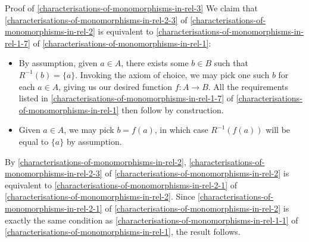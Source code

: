 \begin{Proof}{Proof of \cref{characterisations-of-monomorphisms-in-rel-3}}%
    We claim that \cref{characterisations-of-monomorphisms-in-rel-2-3} of \cref{characterisations-of-monomorphisms-in-rel-2} is equivalent to \cref{characterisations-of-monomorphisms-in-rel-1-7} of \cref{characterisations-of-monomorphisms-in-rel-1}:
    \begin{itemize}
        \item{}By assumption, given $a\in A$, there exists some $b\in B$ such that $R^{-1}(b)=\{a\}$. Invoking the axiom of choice, we may pick one such $b$ for each $a\in A$, giving us our desired function $f\colon A\to B$. All the requirements listed in \cref{characterisations-of-monomorphisms-in-rel-1-7} of \cref{characterisations-of-monomorphisms-in-rel-1} then follow by construction.
        \item{}Given $a\in A$, we may pick $b=f(a)$, in which case $R^{-1}(f(a))$ will be equal to $\{a\}$ by assumption.
    \end{itemize}
    By \cref{characterisations-of-monomorphisms-in-rel-2}, \cref{characterisations-of-monomorphisms-in-rel-2-3} of \cref{characterisations-of-monomorphisms-in-rel-2} is equivalent to \cref{characterisations-of-monomorphisms-in-rel-2-1} of \cref{characterisations-of-monomorphisms-in-rel-2}. Since \cref{characterisations-of-monomorphisms-in-rel-2-1} of \cref{characterisations-of-monomorphisms-in-rel-2} is exactly the same condition as \cref{characterisations-of-monomorphisms-in-rel-1-1} of \cref{characterisations-of-monomorphisms-in-rel-1}, the result follows.


\end{Proof}
